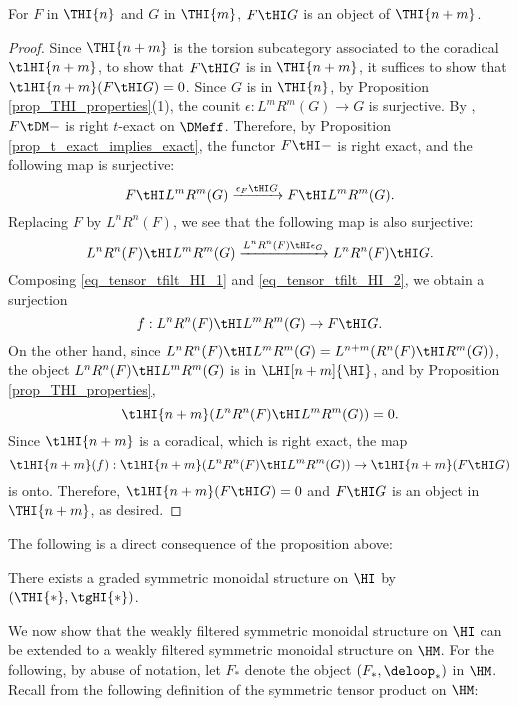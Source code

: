 \begin{prop}\label{prop_tensor_and_tfilt_HI}
For $F$ in $\THI{n}$ and $G$ in $\THI{m}$, $F \tHI G$
is an object of $\THI{n + m}$.
\end{prop}
\begin{proof}
Since $\THI{n + m}$ is the torsion subcategory associated to the
coradical $\tlHI{n + m}$, to show that $F \tHI G$ is in 
$\THI{n + m}$, it suffices to show that $\tlHI{n + m}(F \tHI G) = 
0$. Since $G$ is in $\THI{n}$, by Proposition 
\ref{prop_THI_properties}(1), the counit $\epsilon: L^mR^m(G) \to 
G$ is surjective. By \cite[5.2]{DegModHom}, $F \tDM -$ is right 
$t$-exact on $\DMeff$. Therefore, by Proposition 
\ref{prop_t_exact_implies_exact}, the functor $F \tHI -$ is right 
exact, and the following map is surjective:
\begin{equation}\label{eq_tensor_tfilt_HI_1}
F \tHI L^mR^m(G) \xrightarrow{\epsilon_F \tHI G} F \tHI L^mR^m(G).
\end{equation}
Replacing $F$ by $L^nR^n(F)$, we see that the following map is
also surjective:
\begin{equation}\label{eq_tensor_tfilt_HI_2}
L^nR^n(F) \tHI L^mR^m(G) \xrightarrow{L^nR^n(F) \tHI \epsilon_G}
L^nR^n(F) \tHI G.
\end{equation}
Composing \eqref{eq_tensor_tfilt_HI_1} and 
\eqref{eq_tensor_tfilt_HI_2}, we obtain a surjection
\[
f: L^nR^n(F) \tHI L^mR^m(G) \to F \tHI G.
\]
On the other hand, since $L^nR^n(F) \tHI L^mR^m(G) = 
L^{n + m}(R^n(F) \tHI R^m(G))$, the object $L^nR^n(F) \tHI L^mR^m(G)$
is in $\LHI[n + m]{\HI}$, and by Proposition
\ref{prop_THI_properties}, 
\[
\tlHI{n + m}(L^nR^n(F) \tHI L^mR^m(G)) = 0. 
\]
Since $\tlHI{n + m}$ is a coradical, which is right exact, the map
\[
\tlHI{n + m}(f) : \tlHI{n + m}(L^nR^n(F) \tHI L^mR^m(G)) \to
   \tlHI{n + m}(F \tHI G)
\]
is onto. Therefore, $\tlHI{n + m}(F \tHI G) = 0$ and 
$F \tHI G$ is an object in $\THI{n + m}$, as desired.
\end{proof}

The following is a direct consequence of the proposition above:

\begin{cor}\label{cor_graded_tensor_HI}
There exists a graded symmetric monoidal structure on $\HI$ by
$(\THI{*}, \tgHI{*})$.
\end{cor}

We now show that the weakly filtered symmetric monoidal structure 
on $\HI$ can be extended to a weakly filtered symmetric monoidal 
structure on $\HM$. For the following, by abuse of notation, let 
$F_*$ denote the object $(F_*, \deloop_*)$ in $\HM$. Recall from
\cite[1.16]{DegModHom} the following definition of the symmetric 
tensor product on $\HM$:

